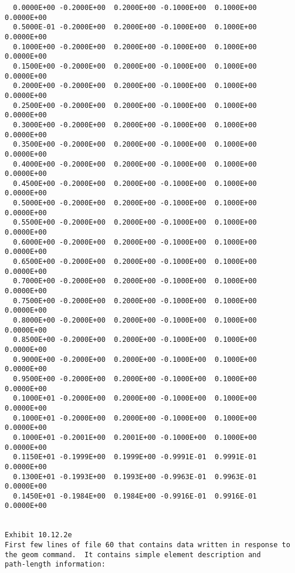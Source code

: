 \begin{footnotesize}
\begin{verbatim}
  0.0000E+00 -0.2000E+00  0.2000E+00 -0.1000E+00  0.1000E+00  0.0000E+00
  0.5000E-01 -0.2000E+00  0.2000E+00 -0.1000E+00  0.1000E+00  0.0000E+00
  0.1000E+00 -0.2000E+00  0.2000E+00 -0.1000E+00  0.1000E+00  0.0000E+00
  0.1500E+00 -0.2000E+00  0.2000E+00 -0.1000E+00  0.1000E+00  0.0000E+00
  0.2000E+00 -0.2000E+00  0.2000E+00 -0.1000E+00  0.1000E+00  0.0000E+00
  0.2500E+00 -0.2000E+00  0.2000E+00 -0.1000E+00  0.1000E+00  0.0000E+00
  0.3000E+00 -0.2000E+00  0.2000E+00 -0.1000E+00  0.1000E+00  0.0000E+00
  0.3500E+00 -0.2000E+00  0.2000E+00 -0.1000E+00  0.1000E+00  0.0000E+00
  0.4000E+00 -0.2000E+00  0.2000E+00 -0.1000E+00  0.1000E+00  0.0000E+00
  0.4500E+00 -0.2000E+00  0.2000E+00 -0.1000E+00  0.1000E+00  0.0000E+00
  0.5000E+00 -0.2000E+00  0.2000E+00 -0.1000E+00  0.1000E+00  0.0000E+00
  0.5500E+00 -0.2000E+00  0.2000E+00 -0.1000E+00  0.1000E+00  0.0000E+00
  0.6000E+00 -0.2000E+00  0.2000E+00 -0.1000E+00  0.1000E+00  0.0000E+00
  0.6500E+00 -0.2000E+00  0.2000E+00 -0.1000E+00  0.1000E+00  0.0000E+00
  0.7000E+00 -0.2000E+00  0.2000E+00 -0.1000E+00  0.1000E+00  0.0000E+00
  0.7500E+00 -0.2000E+00  0.2000E+00 -0.1000E+00  0.1000E+00  0.0000E+00
  0.8000E+00 -0.2000E+00  0.2000E+00 -0.1000E+00  0.1000E+00  0.0000E+00
  0.8500E+00 -0.2000E+00  0.2000E+00 -0.1000E+00  0.1000E+00  0.0000E+00
  0.9000E+00 -0.2000E+00  0.2000E+00 -0.1000E+00  0.1000E+00  0.0000E+00
  0.9500E+00 -0.2000E+00  0.2000E+00 -0.1000E+00  0.1000E+00  0.0000E+00
  0.1000E+01 -0.2000E+00  0.2000E+00 -0.1000E+00  0.1000E+00  0.0000E+00
  0.1000E+01 -0.2000E+00  0.2000E+00 -0.1000E+00  0.1000E+00  0.0000E+00
  0.1000E+01 -0.2001E+00  0.2001E+00 -0.1000E+00  0.1000E+00  0.0000E+00
  0.1150E+01 -0.1999E+00  0.1999E+00 -0.9991E-01  0.9991E-01  0.0000E+00
  0.1300E+01 -0.1993E+00  0.1993E+00 -0.9963E-01  0.9963E-01  0.0000E+00
  0.1450E+01 -0.1984E+00  0.1984E+00 -0.9916E-01  0.9916E-01  0.0000E+00


Exhibit 10.12.2e
First few lines of file 60 that contains data written in response to
the geom command.  It contains simple element description and
path-length information:


\end{verbatim}
\end{footnotesize}
